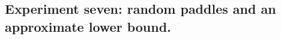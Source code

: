 \subsection[Experiment Seven]{Experiment seven: random paddles and an approximate lower bound.} 



